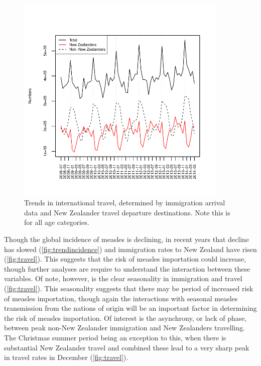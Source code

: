 \documentclass{article}
\begin{document}
\begin{figure}[H]
     \begin{center}
     \includegraphics[width=0.9\textwidth]{nzers.pdf}
     \end{center}
     \caption{Trends in international travel, determined by immigration arrival data and New Zealander travel departure destinations. Note this is for all age categories.}
     \label{fig:travel}
\end{figure}

Though the global incidence of measles is declining, in recent years that decline has slowed (\autoref{fig:trendincidence}) and immigration rates to New Zealand have risen (\autoref{fig:travel}). This suggests that the risk of measles importation could increase, though further analyses are require to understand the interaction between these variables.  Of note, however, is the clear seasonality in immigration and travel (\autoref{fig:travel}).  This seasonality suggests that there may be period of increased risk of measles importation, though again the interactions with seasonal measles transmission from the nations of origin will be an important factor in determining the risk of measles importation. Of interest is the asynchrony, or lack of phase, between peak non-New Zealander immigration and New Zealanders travelling. The Christmas summer period being an exception to this, when there is substantial New Zealander travel and combined these lead to a very sharp peak in travel rates in December (\autoref{fig:travel}).
\end{document}
